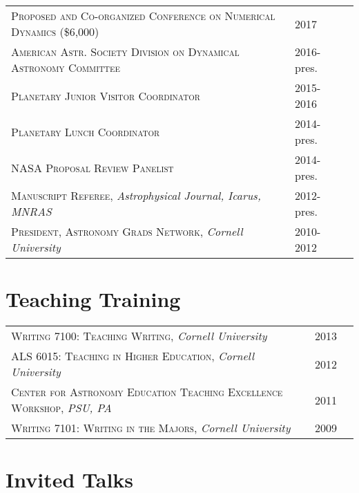 \documentclass[10pt]{article} %
\begin{document}
{\begin{tabular}{l>{\hfill}p{3.0cm}r}
\textsc{Proposed and Co-organized Conference on Numerical Dynamics} \footnotesize(\$6,000)\normalsize & 2017 \\
\textsc{American Astr. Society Division on Dynamical Astronomy Committee} & 2016-pres. \\
\textsc{Planetary Junior Visitor Coordinator} & 2015-2016 \\
\textsc{Planetary Lunch Coordinator} & 2014-pres. \\
\textsc{NASA Proposal Review Panelist} & 2014-pres.\\
\textsc{Manuscript Referee}, {\it Astrophysical Journal, Icarus, MNRAS} & 2012-pres.\\
\textsc{President, Astronomy Grads Network}, {\it Cornell University} & 2010-2012\\
\end{tabular}


\section{Teaching Training}

\begin{tabular}{l>{\hfill}p{2.1cm}r}
\textsc{Writing 7100:  Teaching Writing}, {\it Cornell University} & 2013 \\
\textsc{ALS 6015:  Teaching in Higher Education}, {\it Cornell University} & 2012\\
\textsc{Center for Astronomy Education Teaching Excellence Workshop}, {\it PSU, PA} & 2011 \\
\textsc{Writing 7101: Writing in the Majors}, {\it Cornell University} & 2009 \\
\end{tabular}


\section{Invited Talks}

}
\end{document}
